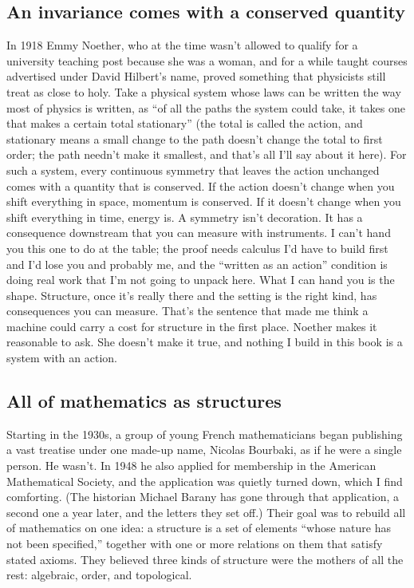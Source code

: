 \documentclass[11pt,twoside]{article}
\theoremstyle{thielethm}
\theoremstyle{thieledef}
\theoremstyle{thieledef}
\theoremstyle{thieledef}
\theoremstyle{thielethm}
\theoremstyle{thieleobs}
\theoremstyle{thielethm}
\begin{document}
\subsection{An invariance comes with a conserved quantity}

In 1918 Emmy Noether, who at the time wasn't allowed to qualify for a university teaching post because she was a woman, and for a while taught courses advertised under David Hilbert's name, proved something that physicists still treat as close to holy. Take a physical system whose laws can be written the way most of physics is written, as ``of all the paths the system could take, it takes one that makes a certain total stationary'' (the total is called the action, and stationary means a small change to the path doesn't change the total to first order; the path needn't make it smallest, and that's all I'll say about it here). For such a system, every continuous symmetry that leaves the action unchanged comes with a quantity that is conserved. If the action doesn't change when you shift everything in space, momentum is conserved. If it doesn't change when you shift everything in time, energy is. A symmetry isn't decoration. It has a consequence downstream that you can measure with instruments. I can't hand you this one to do at the table; the proof needs calculus I'd have to build first and I'd lose you and probably me, and the ``written as an action'' condition is doing real work that I'm not going to unpack here. What I can hand you is the shape. Structure, once it's really there and the setting is the right kind, has consequences you can measure. That's the sentence that made me think a machine could carry a cost for structure in the first place. Noether makes it reasonable to ask. She doesn't make it true, and nothing I build in this book is a system with an action.

\subsection{All of mathematics as structures}

Starting in the 1930s, a group of young French mathematicians began publishing a vast treatise under one made-up name, Nicolas Bourbaki, as if he were a single person. He wasn't. In 1948 he also applied for membership in the American Mathematical Society, and the application was quietly turned down, which I find comforting. (The historian Michael Barany has gone through that application, a second one a year later, and the letters they set off.) Their goal was to rebuild all of mathematics on one idea: a structure is a set of elements ``whose nature has not been specified,'' together with one or more relations on them that satisfy stated axioms. They believed three kinds of structure were the mothers of all the rest: algebraic, order, and topological.
\end{document}
